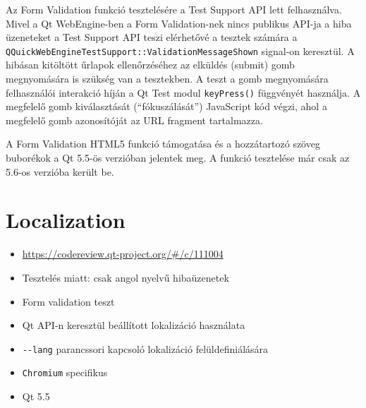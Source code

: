 \documentclass[12pt]{report}
\let\origurl\url
\renewcommand{\url}[1]{%
    \textcolor{blue}{\origurl{#1}}
}
\newcommand{\gerrit}[1]{%
    \textcolor{qtgreen}{\origurl{https://codereview.qt-project.org/\#/c/#1}}
}
\begin{document}
Az Form Validation funkció tesztelésére a Test Support API lett felhasználva. Mivel a
Qt WebEngine-ben a Form Validation-nek nincs publikus API-ja a hiba üzeneteket a
Test Support API teszi elérhetővé a tesztek számára a \\
\texttt{QQuickWebEngineTestSupport::ValidationMessageShown}
signal-on keresztül. A hibásan kitöltött űrlapok ellenőrzéséhez az elküldés (submit) gomb
megnyomására is szükség van a tesztekben. A teszt a gomb megnyomására felhasználói interakció
híján a Qt Test modul \texttt{keyPress()} függvényét használja. A megfelelő gomb
kiválasztását (``fókuszálását'') JavaScript kód végzi, ahol a megfelelő gomb azonosítóját
az URL fragment tartalmazza.

A Form Validation HTML5 funkció támogatása és a hozzátartozó szöveg buborékok a Qt 5.5-ös
verzióban jelentek meg. A funkció tesztelése már csak az 5.6-os verzióba került be.


\section{Localization}

\begin{center}
    \begin{reviewbox}
        \begin{itemize}
            \renewcommand{\labelitemi}{\textcolor{qtgreen}{$\blacktriangleright$}}
            \item \gerrit{111004}
        \end{itemize}
    \end{reviewbox}
\end{center}

\begin{itemize}
    \item Tesztelés miatt: csak angol nyelvű hibaüzenetek
    \item Form validation teszt
    \item Qt API-n keresztül beállított lokalizáció használata
    \item \texttt{-{}-lang} parancssori kapcsoló lokalizáció felüldefiniálására
    \item \texttt{Chromium} specifikus
    \item Qt 5.5
\end{itemize}
\pagebreak
\end{document}
